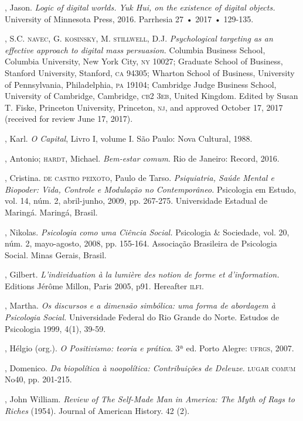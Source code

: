 \begin{bibliohedra}
, Jason. \emph{Logic of digital worlds. Yuk Hui, on the
existence of digital objects.} University of Minnesota Press, 2016.
Parrhesia 27 • 2017 • 129-135.

, S.C. \textsc{navec}, G. \textsc{kosinsky}, M. \textsc{stillwell}, D.J. \emph{Psychological targeting as an effective approach to digital mass persuasion.} Columbia
Business School, Columbia University, New York City, \textsc{ny} 10027; Graduate
School of Business, Stanford University, Stanford, \textsc{ca} 94305; Wharton
School of Business, University of Pennsylvania, Philadelphia, \textsc{pa} 19104;
Cambridge Judge Business School, University of Cambridge, Cambridge, \textsc{cb}2
3\textsc{eb}, United Kingdom. Edited by Susan T. Fiske, Princeton University,
Princeton, \textsc{nj}, and approved October 17, 2017 (received for review June
17, 2017).

, Karl. \emph{O Capital}, Livro I, volume I. São Paulo: Nova
Cultural, 1988.

, Antonio; \textsc{hardt}, Michael. \emph{Bem-estar comum}. Rio de
Janeiro: Record, 2016.

, Cristina. \textsc{de castro peixoto}, Paulo de Tarso.
\emph{Psiquiatria, Saúde Mental e Biopoder: Vida, Controle e Modulação
no Contemporâneo.} Psicologia em Estudo, vol. 14, núm. 2, abril-junho,
2009, pp. 267-275. Universidade Estadual de Maringá. Maringá, Brasil.

, Nikolas. \emph{Psicologia como uma Ciência Social.} Psicologia
\& Sociedade, vol. 20, núm. 2, mayo-agosto, 2008, pp. 155-164.
Associação Brasileira de Psicologia Social. Minas Gerais, Brasil.

, Gilbert. \emph{L'individuation à la lumière des notion de
forme et d'information.} Editions Jérôme Millon, Paris 2005, p91.
Hereafter \textsc{ilfi}.

, Martha. \emph{Os discursos e a dimensão simbólica: uma
forma de abordagem à Psicologia Social.} Universidade Federal do Rio
Grande do Norte. Estudos de Psicologia 1999, 4(1), 39-59.

, Hélgio (org.). \emph{O Positivismo: teoria e prática}. 3ª
ed. Porto Alegre: \textsc{ufrgs}, 2007.

, Domenico. \emph{Da biopolítica à noopolítica: Contribuições de Deleuze.} \textsc{lugar comum} No40, pp. 201-215.

, John William. \emph{Review of The Self-Made Man in America:
The Myth of Rags to Riches} (1954). Journal of American History. 42 (2).
\end{bibliohedra}



